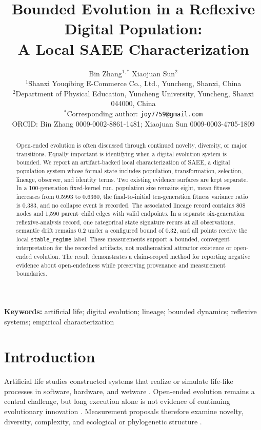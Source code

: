 \documentclass[12pt]{article}
\title{Bounded Evolution in a Reflexive Digital Population:\\
A Local SAEE Characterization}
\author{Bin Zhang$^{1,*}$ \quad Xiaojuan Sun$^{2}$\\[0.5em]
\small $^1$Shanxi Youqibing E-Commerce Co., Ltd., Yuncheng, Shanxi, China\\
\small $^2$Department of Physical Education, Yuncheng University,
Yuncheng, Shanxi 044000, China\\
\small $^*$Corresponding author: \texttt{joy7759@gmail.com}\\
\small ORCID: Bin Zhang 0009-0002-8861-1481; Xiaojuan Sun 0009-0003-4705-1809}
\date{}
\begin{document}
\maketitle

\begin{abstract}
Open-ended evolution is often discussed through continued novelty, diversity,
or major transitions. Equally important is identifying when a digital
evolution system is bounded. We report an artifact-backed local
characterization of SAEE, a digital population system whose formal state
includes population, transformation, selection, lineage, observer, and
identity terms. Two existing evidence surfaces are kept separate. In a
100-generation fixed-kernel run, population size remains eight, mean fitness
increases from 0.5993 to 0.6360, the final-to-initial ten-generation fitness
variance ratio is 0.383, and no collapse event is recorded. The associated
lineage record contains 808 nodes and 1,590 parent--child edges with valid
endpoints. In a separate six-generation reflexive-analysis record, one
categorical state signature recurs at all observations, semantic drift remains
0.2 under a configured bound of 0.32, and all points receive the local
\texttt{stable\_regime} label. These measurements support a bounded,
convergent interpretation for the recorded artifacts, not mathematical
attractor existence or open-ended evolution. The result demonstrates a
claim-scoped method for reporting negative evidence about open-endedness while
preserving provenance and measurement boundaries.
\end{abstract}

\noindent\textbf{Keywords:} artificial life; digital evolution; lineage;
bounded dynamics; reflexive systems; empirical characterization

\newpage
{}

\section{Introduction}

Artificial life studies constructed systems that realize or simulate
life-like processes in software, hardware, and wetware \citep{dorin2024}.
Open-ended evolution remains a central challenge, but long execution alone is
not evidence of continuing evolutionary innovation \citep{taylor2016,hintze2019}.
Measurement proposals therefore examine novelty, diversity, complexity, and
ecological or phylogenetic structure \citep{dolson2019,moreno2025}.
\end{document}
